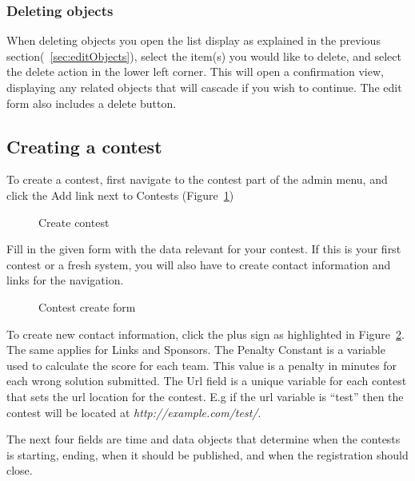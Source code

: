 \subsubsection{Deleting objects}

When deleting objects you open the list display as explained in the
previous section(~\ref{sec:editObjects}), select the item(s) you would like to delete,
and select the delete action in the lower left corner. This will open a
confirmation view, displaying any related objects that will cascade if
you wish to continue. The edit form also includes a delete button.



\subsection{Creating a contest}

To create a contest, first navigate to the contest part of the admin
menu, and click the Add link next to Contests (Figure~\ref{fig:createContest})

\begin{figure}
\centering
	\caption{Create contest}
	\label{fig:createContest}
\end{figure}

Fill in the given form with the data relevant for your contest. If this
is your first contest or a fresh system, you will also have to create
contact information and links for the navigation.

\begin{figure}
\centering
	\caption{Contest create form}
	\label{fig:contestCreateForm}
\end{figure}

To create new contact information, click the plus sign as highlighted in
Figure~\ref{fig:contestCreateForm}. The same applies for Links and Sponsors. The Penalty
Constant is a variable used to calculate the score for each team. This
value is a penalty in minutes for each wrong solution submitted. The
Url field is a unique variable for each contest that sets the url
location for the contest. E.g if the url variable is
{\textquotedblleft}test{\textquotedblright} then the contest will be
located at \textit{http://example.com/test/}. 

The next four fields are time and data objects that determine when the
contests is starting, ending, when it should be published, and when the
registration should close.

